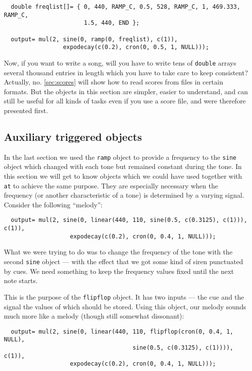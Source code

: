 \documentclass{article}
\def\bv{\begin{verbatim}}
\begin{document}
\bv
  double freqlist[]= { 0, 440, RAMP_C, 0.5, 528, RAMP_C, 1, 469.333, RAMP_C,
                       1.5, 440, END };

  output= mul(2, sine(0, ramp(0, freqlist), c(1)), 
                 expodecay(c(0.2), cron(0, 0.5, 1, NULL)));
\end{verbatim}

Now, if you want to write a song, will you have to write tens of {\tt double}
arrays several thousand entries in length which you have to take care to   keep
consistent?  Actually, no.  \autoref{sec:scores} will show how to read scores
from files in certain formats.  But the objects in this section
are simpler, easier to understand, and can still be useful for all kinds of
tasks even if you use a score file, and were therefore presented first.


\subsection{Auxiliary triggered objects}

In the last section we used the {\tt ramp} object to provide a frequency to the
{\tt sine} object which changed with each tone but remained constant during the
tone.  In this section we will get to know objects which we could have used
together with {\tt at} to achieve the same purpose.  They are especially
necessary when the frequency (or another characteristic of a tone) is
determined by a varying signal.  Consider the following ``melody'':

\bv
  output= mul(2, sine(0, linear(440, 110, sine(0.5, c(0.3125), c(1))), c(1)),
                   expodecay(c(0.2), cron(0, 0.4, 1, NULL)));
\end{verbatim}

What we were trying to do was to change the frequency of the tone with the
second {\tt sine} object --- with the effect that we got some kind of siren
punctuated by cues.  We need something to keep the frequency values fixed until
the next note starts.  

This is the purpose of the {\tt flipflop} object.  It has two inputs --- the
cue and the signal the values of which should be stored.  Using this object,
our melody sounds much more like a melody (though still somewhat dissonant):

\bv
  output= mul(2, sine(0, linear(440, 110, flipflop(cron(0, 0.4, 1, NULL),
                                     sine(0.5, c(0.3125), c(1)))), c(1)),
                   expodecay(c(0.2), cron(0, 0.4, 1, NULL)));
\end{verbatim}
\end{document}
